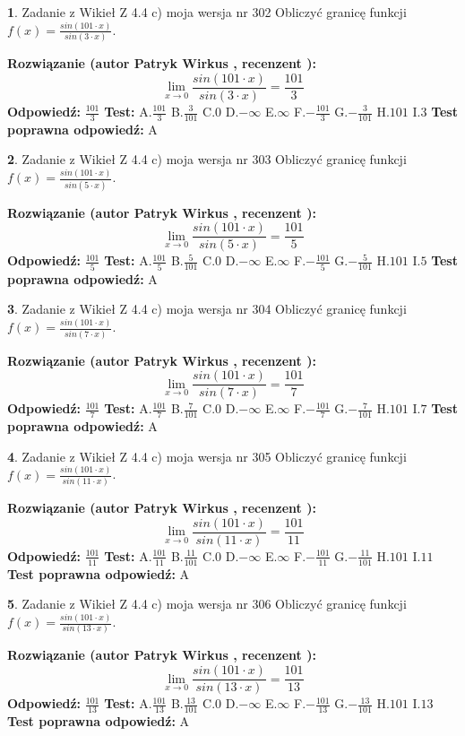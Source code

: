 \documentclass[12pt, a4paper]{article}
\theoremstyle{definition} %
\newtheorem{zad}{}
\newcommand{\zadStart}[1]{\begin{zad}#1\newline}
\newcommand{\zadStop}{\end{zad}}
\newcommand{\rozwStart}[2]{\noindent \textbf{Rozwiązanie (autor #1 , recenzent #2): }\newline}
\newcommand{\rozwStop}{\newline}
\newcommand{\odpStart}{\noindent \textbf{Odpowiedź:}\newline}
\newcommand{\odpStop}{\newline}
\newcommand{\testStart}{\noindent \textbf{Test:}\newline}
\newcommand{\testStop}{\newline}
\newcommand{\kluczStart}{\noindent \textbf{Test poprawna odpowiedź:}\newline}
\newcommand{\kluczStop}{\newline}
\begin{document}
\zadStart{Zadanie z Wikieł Z 4.4 c) moja wersja nr 302}
Obliczyć granicę funkcji $f(x)=\frac{sin(101\cdot x)}{sin(3\cdot x)}$.
\zadStop
\rozwStart{Patryk Wirkus}{}
$$\lim\limits_{x\to 0}\frac{sin(101\cdot x)}{sin(3\cdot x)}=
\frac{101}{3}$$
\rozwStop
\odpStart
$\frac{101}{3}$
\odpStop
\testStart
A.$\frac{101}{3}$
B.$\frac{3}{101}$
C.$0$
D.$-\infty$
E.$\infty$
F.$-\frac{101}{3}$
G.$-\frac{3}{101}$
H.$101$
I.$3$
\testStop
\kluczStart
A
\kluczStop



\zadStart{Zadanie z Wikieł Z 4.4 c) moja wersja nr 303}
Obliczyć granicę funkcji $f(x)=\frac{sin(101\cdot x)}{sin(5\cdot x)}$.
\zadStop
\rozwStart{Patryk Wirkus}{}
$$\lim\limits_{x\to 0}\frac{sin(101\cdot x)}{sin(5\cdot x)}=
\frac{101}{5}$$
\rozwStop
\odpStart
$\frac{101}{5}$
\odpStop
\testStart
A.$\frac{101}{5}$
B.$\frac{5}{101}$
C.$0$
D.$-\infty$
E.$\infty$
F.$-\frac{101}{5}$
G.$-\frac{5}{101}$
H.$101$
I.$5$
\testStop
\kluczStart
A
\kluczStop



\zadStart{Zadanie z Wikieł Z 4.4 c) moja wersja nr 304}
Obliczyć granicę funkcji $f(x)=\frac{sin(101\cdot x)}{sin(7\cdot x)}$.
\zadStop
\rozwStart{Patryk Wirkus}{}
$$\lim\limits_{x\to 0}\frac{sin(101\cdot x)}{sin(7\cdot x)}=
\frac{101}{7}$$
\rozwStop
\odpStart
$\frac{101}{7}$
\odpStop
\testStart
A.$\frac{101}{7}$
B.$\frac{7}{101}$
C.$0$
D.$-\infty$
E.$\infty$
F.$-\frac{101}{7}$
G.$-\frac{7}{101}$
H.$101$
I.$7$
\testStop
\kluczStart
A
\kluczStop



\zadStart{Zadanie z Wikieł Z 4.4 c) moja wersja nr 305}
Obliczyć granicę funkcji $f(x)=\frac{sin(101\cdot x)}{sin(11\cdot x)}$.
\zadStop
\rozwStart{Patryk Wirkus}{}
$$\lim\limits_{x\to 0}\frac{sin(101\cdot x)}{sin(11\cdot x)}=
\frac{101}{11}$$
\rozwStop
\odpStart
$\frac{101}{11}$
\odpStop
\testStart
A.$\frac{101}{11}$
B.$\frac{11}{101}$
C.$0$
D.$-\infty$
E.$\infty$
F.$-\frac{101}{11}$
G.$-\frac{11}{101}$
H.$101$
I.$11$
\testStop
\kluczStart
A
\kluczStop



\zadStart{Zadanie z Wikieł Z 4.4 c) moja wersja nr 306}
Obliczyć granicę funkcji $f(x)=\frac{sin(101\cdot x)}{sin(13\cdot x)}$.
\zadStop
\rozwStart{Patryk Wirkus}{}
$$\lim\limits_{x\to 0}\frac{sin(101\cdot x)}{sin(13\cdot x)}=
\frac{101}{13}$$
\rozwStop
\odpStart
$\frac{101}{13}$
\odpStop
\testStart
A.$\frac{101}{13}$
B.$\frac{13}{101}$
C.$0$
D.$-\infty$
E.$\infty$
F.$-\frac{101}{13}$
G.$-\frac{13}{101}$
H.$101$
I.$13$
\testStop
\kluczStart
A
\kluczStop
\end{document}
